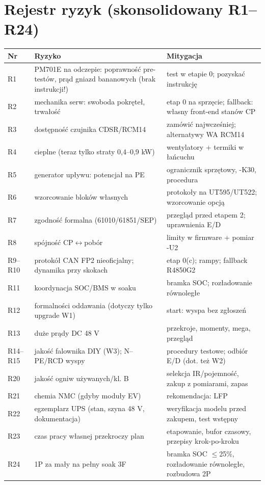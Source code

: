 \documentclass[11pt,a4paper]{article}
\begin{document}
\section{Rejestr ryzyk (skonsolidowany R1--R24)}
\begin{longtable}{@{}p{}p{}p{}@{}}
\toprule
\textbf{Nr} & \textbf{Ryzyko} & \textbf{Mitygacja}\\
\midrule
R1 & PM701E na odczepie: poprawność pre-testów, prąd gniazd bananowych (brak instrukcji!) & test w etapie 0; pozyskać instrukcję\\
R2 & mechanika serw: swoboda pokręteł, trwałość & etap 0 na sprzęcie; fallback: własny front-end stanów CP\\
R3 & dostępność czujnika CDSR/RCM14 & zamówić najwcześniej; alternatywy WA RCM14\\
R4 & cieplne (teraz tylko straty 0,4--0,9 kW) & wentylatory + termiki w łańcuchu\\
R5 & generator upływu: potencjał na PE & ogranicznik sprzętowy, -K30, procedura\\
R6 & wzorcowanie bloków własnych & protokoły na UT595/UT522; wzorcowanie opcją\\
R7 & zgodność formalna (61010/61851/SEP) & przegląd przed etapem 2; uprawnienia E/D\\
R8 & spójność CP$\leftrightarrow$pobór & limity w firmware + pomiar -U2\\
R9--R10 & protokół CAN FP2 nieoficjalny; dynamika przy skokach & etap 0(c); rampy; fallback R4850G2\\
R11 & koordynacja SOC/BMS w soaku & bramka SOC; rozładowanie równoległe\\
R12 & formalności oddawania (dotyczy tylko upgrade W1) & start: wyspa bez zgłoszeń\\
R13 & duże prądy DC 48 V & przekroje, momenty, mega, przegląd\\
R14--R15 & jakość falownika DIY (W3); N--PE/RCD wyspy & procedury testowe; odbiór E/D (dot. też W2)\\
R20 & jakość ogniw używanych/kl. B & selekcja IR/pojemność, zakup z pomiarami, zapas\\
R21 & chemia NMC (gdyby moduły EV) & rekomendacja: LFP\\
R22 & egzemplarz UPS (stan, szyna 48 V, dokumentacja) & weryfikacja modelu przed zakupem, test wstępny\\
R23 & czas pracy własnej przekroczy plan & etapowanie, bufor czasowy, przepisy krok-po-kroku\\
R24 & 1P za mały na pełny soak 3F & bramka SOC $\le$25\%, rozładowanie równoległe, rozbudowa 2P\\
\bottomrule
\end{longtable}
\end{document}

